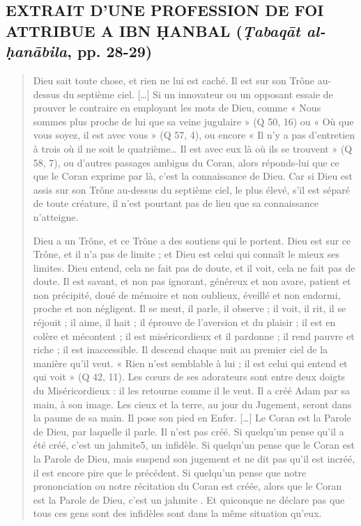 \subsection{EXTRAIT D'UNE PROFESSION DE FOI ATTRIBUE A IBN ḤANBAL
(\emph{Ṭabaqāt al-ḥanābila}, pp. 28-29)}
\begin{quote}
    Dieu sait toute chose, et rien ne lui est caché. Il est sur son Trône
au-dessus du septième ciel. {[}\ldots{]} Si un
innovateur ou un opposant essaie de prouver le
contraire en employant les mots de Dieu, comme « Nous sommes plus proche
de lui que sa veine jugulaire » (Q 50, 16) ou « Où que vous soyez, il
est avec vous » (Q 57, 4), ou encore « Il n'y a pas d'entretien à trois
où il ne soit le quatrième\ldots{} Il est avec eux là où ils se trouvent
» (Q 58, 7), ou d'autres passages ambigus du Coran, alors réponds-lui
que ce que le Coran exprime par là, c'est la connaissance de Dieu. Car
si Dieu est assis sur son Trône au-dessus du septième ciel, le plus
élevé, s'il est séparé de toute créature, il n'est pourtant pas de lieu
que sa connaissance n'atteigne.

Dieu a un Trône, et ce Trône a des soutiens qui le portent. Dieu est sur
ce Trône, et il n'a pas de limite ; et Dieu est celui qui connaît le
mieux ses limites. Dieu entend, cela ne fait pas de doute, et il voit,
cela ne fait pas de doute. Il est savant, et non pas ignorant, généreux
et non avare, patient et non précipité, doué de mémoire et non oublieux,
éveillé et non endormi, proche et non négligent. Il se meut, il parle,
il observe ; il voit, il rit, il se réjouit ; il aime, il hait ; il
éprouve de l'aversion et du plaisir ; il est en colère et mécontent ; il
est miséricordieux et il pardonne ; il rend pauvre et riche ; il est
inaccessible. Il descend chaque nuit au premier ciel de la manière qu'il
veut. « Rien n'est semblable à lui ; il est celui qui entend et qui voit
» (Q 42, 11). Les cœurs de ses adorateurs sont entre deux doigts du
Miséricordieux : il les retourne comme il le veut. Il a créé Adam par sa
main,
à son image. Les cieux et la terre, au jour du Jugement, seront dans la paume de sa main. Il pose son pied en Enfer. […]
Le Coran est la Parole de Dieu, par laquelle il parle. Il n’est pas créé. Si quelqu’un pense qu’il a été créé, c’est un jahmite5, un infidèle. Si quelqu’un pense que le Coran est la Parole de Dieu, mais suspend son jugement et ne dit pas qu’il est incréé, il est encore pire que le précédent. Si quelqu’un pense que notre prononciation ou notre récitation du Coran est créée, alors que le Coran est la Parole de Dieu, c’est un jahmite . Et quiconque ne déclare pas que tous ces gens sont des infidèles sont dans la même situation qu’eux.
\end{quote}




